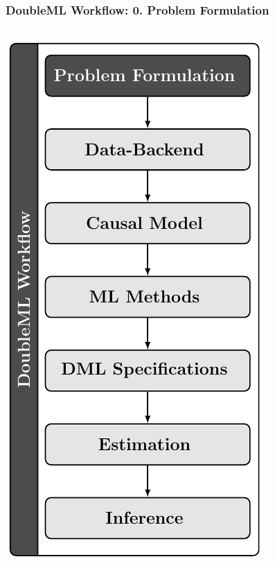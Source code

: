 \begin{frame}[fragile]
\frametitle{DoubleML Workflow: 0. Problem Formulation}
\begin{columns}
\begin{column}{0.3\textwidth}
\includegraphics[width = \textwidth]{workflow/doubleml_workflow_problem.pdf}

\end{column}
\end{columns}
\end{frame}
